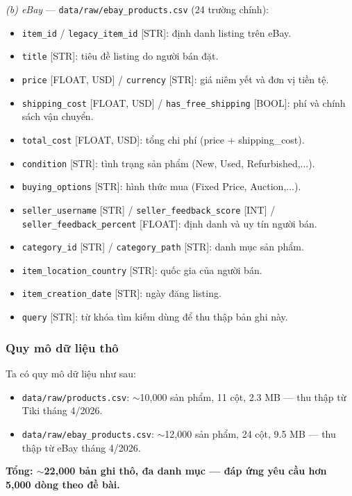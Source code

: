 \textit{(b) eBay} — \texttt{data/raw/ebay\_products.csv} (24 trường chính):
\begin{itemize} [leftmargin=1.5cm]
    \item \texttt{item\_id} / \texttt{legacy\_item\_id} [STR]: định danh listing trên eBay.
    \item \texttt{title} [STR]: tiêu đề listing do người bán đặt.
    \item \texttt{price} [FLOAT, USD] / \texttt{currency} [STR]: giá niêm yết và đơn vị tiền tệ.
    \item \texttt{shipping\_cost} [FLOAT, USD] / \texttt{has\_free\_shipping} [BOOL]: phí và chính sách vận chuyển.
    \item \texttt{total\_cost} [FLOAT, USD]: tổng chi phí (price + shipping\_cost).
    \item \texttt{condition} [STR]: tình trạng sản phẩm (New, Used, Refurbished,...).
    \item \texttt{buying\_options} [STR]: hình thức mua (Fixed Price, Auction,...).
    \item \texttt{seller\_username} [STR] / \texttt{seller\_feedback\_score} [INT] / \texttt{seller\_feedback\_percent} [FLOAT]: định danh và uy tín người bán.
    \item \texttt{category\_id} [STR] / \texttt{category\_path} [STR]: danh mục sản phẩm.
    \item \texttt{item\_location\_country} [STR]: quốc gia của người bán.
    \item \texttt{item\_creation\_date} [STR]: ngày đăng listing.
    \item \texttt{query} [STR]: từ khóa tìm kiếm dùng để thu thập bản ghi này.
\end{itemize}

\subsubsection{Quy mô dữ liệu thô}
Ta có quy mô dữ liệu như sau:
\begin{itemize} [leftmargin=1.5cm]
    \item \texttt{data/raw/products.csv}: $\sim$10,000 sản phẩm, 11 cột, 2.3 MB — thu thập từ Tiki tháng 4/2026.
    \item \texttt{data/raw/ebay\_products.csv}: $\sim$12,000 sản phẩm, 24 cột, 9.5 MB — thu thập từ eBay tháng 4/2026.
\end{itemize}

\textbf{Tổng: $\sim$22,000 bản ghi thô, đa danh mục — đáp ứng yêu cầu hơn 5,000 dòng theo đề bài.}


